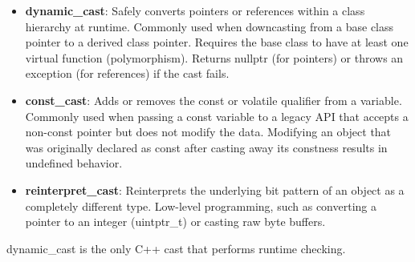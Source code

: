\documentclass{report}
\begin{document}
\begin{itemize}
\begin{itemize}
                \item \textbf{dynamic\_cast}: Safely converts pointers or references within a class hierarchy at runtime.
                    \bigbreak \noindent 
                    Commonly used when downcasting from a base class pointer to a derived class pointer.
                    \bigbreak \noindent 
                    Requires the base class to have at least one virtual function (polymorphism). Returns nullptr (for pointers) or throws an exception (for references) if the cast fails.
                \item \textbf{const\_cast}: Adds or removes the const or volatile qualifier from a variable.
                    \bigbreak \noindent 
                    Commonly used when passing a const variable to a legacy API that accepts a non-const pointer but does not modify the data.
                    \bigbreak \noindent 
                    Modifying an object that was originally declared as const after casting away its constness results in undefined behavior.
                \item \textbf{reinterpret\_cast}: Reinterprets the underlying bit pattern of an object as a completely different type.
                    \bigbreak \noindent 
                     Low-level programming, such as converting a pointer to an integer (uintptr\_t) or casting raw byte buffers.
            \end{itemize}
            dynamic\_cast is the only C++ cast that performs runtime checking.






    \end{itemize}

    \pagebreak 
\end{document}

